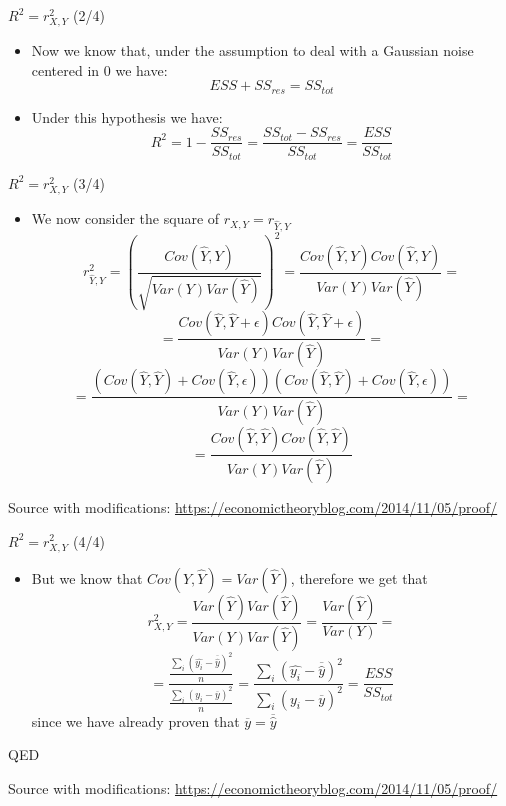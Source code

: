 \documentclass{beamer}
\begin{document}
\begin{frame}
{\centerline{$R^2 = r_{X,Y}^2$ (2/4)}}
\begin{itemize}
\item Now we know that, under the assumption to deal with a Gaussian noise centered in 0 we have:
$$ESS + SS_{res} = SS_{tot} $$
\item Under this hypothesis we have:
$$R^2 = 1 - \frac{SS_{res}}{SS_{tot}} = \frac{SS_{tot}-SS_{res}}{SS_{tot}} = \frac{ESS}{SS_{tot}} $$
\end{itemize}

\end{frame}

\begin{frame}
{\centerline{$R^2 = r_{X,Y}^2$ (3/4)}}
\begin{itemize}
\item We now consider the square of $r_{X,Y} = r_{\hat{Y},Y}$
$$r_{\hat{Y},Y}^2= \left ( \frac{Cov(\hat{Y},Y)}{\sqrt{Var(Y)Var(\hat{Y})}} \right )^2 =  \frac{Cov(\hat{Y},Y)Cov(\hat{Y},Y)}{Var(Y)Var(\hat{Y})} = $$
$$ = \frac{Cov(\hat{Y},\hat{Y} + \epsilon)Cov(\hat{Y},\hat{Y} + \epsilon)}{Var(Y)Var(\hat{Y})} = $$
$$ 
= \frac{(Cov(\hat{Y},\hat{Y})+ Cov(\hat{Y},\epsilon))(Cov(\hat{Y},\hat{Y})+ Cov(\hat{Y},\epsilon))}{Var(Y)Var(\hat{Y})} = $$
$$ 
= \frac{Cov(\hat{Y},\hat{Y})Cov(\hat{Y},\hat{Y})}{Var(Y)Var(\hat{Y})} $$


\end{itemize}

\begin{center}
\tiny 
Source with modifications: \url{https://economictheoryblog.com/2014/11/05/proof/}
\end{center}
\end{frame}

\begin{frame}
{\centerline{$R^2 = r_{X,Y}^2$ (4/4)}}
\begin{itemize}
\item But we know that $Cov(\hat{Y},\hat{Y}) = Var(\hat{Y})$, therefore we get that
$$r_{X,Y}^2 = \frac{Var(\hat{Y})Var(\hat{Y})}{Var(Y)Var(\hat{Y})} = \frac{Var(\hat{Y})}{Var(Y)}=$$
$$ = \frac{\frac{\sum_i{(\hat{y_i}-\overline{\hat{y}})^2}}{n}}{\frac{\sum_i(y_i-\overline{y})^2}{n}}
= \frac{{\sum_i{(\hat{y_i}-\overline{\hat{y}})^2}}}{\sum_i(y_i-\overline{y})^2} =  \frac{ESS}{SS_{tot}} $$
since we have already proven that $\overline{y} = \overline{\hat{y}}$
\end{itemize}
QED

\begin{center}
\tiny 
Source with modifications: \url{https://economictheoryblog.com/2014/11/05/proof/}
\end{center}
\end{frame}
\end{document}
